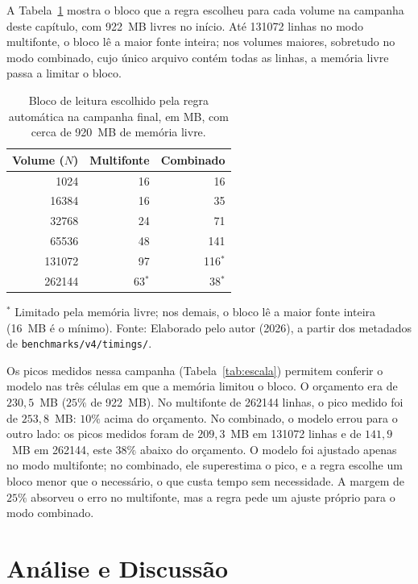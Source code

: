 A Tabela~\ref{tab:qp5-auto} mostra o bloco que a regra escolheu para cada volume na campanha
deste capítulo, com 922~MB livres no início. Até \num{131072} linhas no modo
multifonte, o bloco lê a maior fonte inteira; nos volumes maiores, sobretudo no modo
combinado, cujo único arquivo contém todas as linhas, a memória livre passa a limitar o bloco.

\begin{table}[H]
  \caption{Bloco de leitura escolhido pela regra automática na campanha final, em MB, com cerca de 920~MB de memória livre.}
  \label{tab:qp5-auto}
  \centering
  \begin{tabular}{r r r}
    \toprule
    \textbf{Volume ($N$)} & \textbf{Multifonte} & \textbf{Combinado} \\
    \midrule
    \num{1024}   & 16 & 16 \\
    \num{16384}  & 16 & 35 \\
    \num{32768}  & 24 & 71 \\
    \num{65536}  & 48 & 141 \\
    \num{131072} & 97 & 116$^{*}$ \\
    \num{262144} & 63$^{*}$ & 38$^{*}$ \\
    \bottomrule
  \end{tabular}
  \par\vspace{4pt}
  {\footnotesize $^{*}$ Limitado pela memória livre; nos demais, o bloco lê a maior fonte inteira (16~MB é o mínimo). Fonte: Elaborado pelo autor (2026), a partir dos metadados de \texttt{benchmarks/v4/timings/}.}
\end{table}

Os picos medidos nessa campanha (Tabela~\ref{tab:escala}) permitem conferir o modelo nas
três células em que a memória limitou o bloco. O orçamento era de $230{,}5$~MB ($25\%$ de
922~MB). No multifonte de \num{262144} linhas, o pico medido foi de $253{,}8$~MB: $10\%$
acima do orçamento. No combinado, o modelo errou para o outro lado: os picos medidos foram
de $209{,}3$~MB em \num{131072} linhas e de $141{,}9$~MB em \num{262144}, este $38\%$
abaixo do orçamento. O modelo foi ajustado apenas no modo multifonte; no combinado, ele
superestima o pico, e a regra escolhe um bloco menor que o necessário, o que custa tempo sem
necessidade. A margem de $25\%$ absorveu o erro no multifonte, mas a regra pede um ajuste
próprio para o modo combinado.

\section{Análise e Discussão}
\label{sec:discussao-avaliacao}

